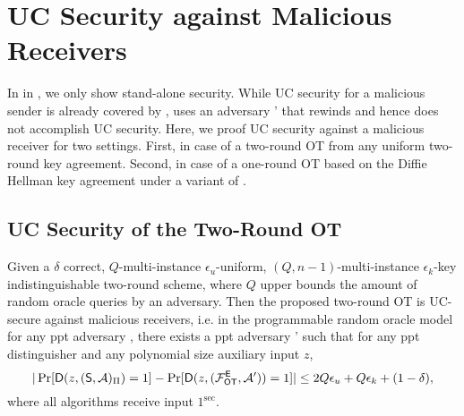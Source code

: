 \section{UC Security against Malicious Receivers}\label{sec:UCOT}

In  in , we only show stand-alone security. While UC security for a malicious sender is already covered by , 
 uses an adversary \Adv' that rewinds \Adv and hence does not accomplish UC security. Here, we proof UC security against a malicious receiver for two settings. First, in case of a two-round OT from any uniform two-round key agreement. Second, in case of a one-round OT based on the Diffie Hellman key agreement under a variant of \DDH.  


\subsection{UC Security of the Two-Round OT}
 
\begin{claim}\label{claim:UCmalreceiver}
Given a $\delta$ correct,  $Q$-multi-instance $\epsilon_u$-uniform,  $(Q,n-1)$-multi-instance $\epsilon_k$-key indistinguishable two-round \UKA scheme, where $Q$ upper bounds the amount of random oracle queries by an adversary. Then the proposed two-round OT is UC-secure against malicious receivers, i.e. in the programmable random oracle model for any ppt adversary \Adv, there exists a ppt adversary \Adv' such that for any ppt distinguisher \D and any polynomial size auxiliary input $z$,
$$
|\Pr[\mathsf D(z,(\mathsf{S}, \mathcal{A})_{\Pi})=1] -\Pr[\mathsf D(z,(\mathcal{F}_{\mathsf{OT}}^\mathsf{E},\mathcal{A}'))=1]|\leq 2Q\epsilon_{u}+Q\epsilon_{k}+(1-\delta),
$$
where all algorithms receive input $1^\sec$.
\end{claim}


